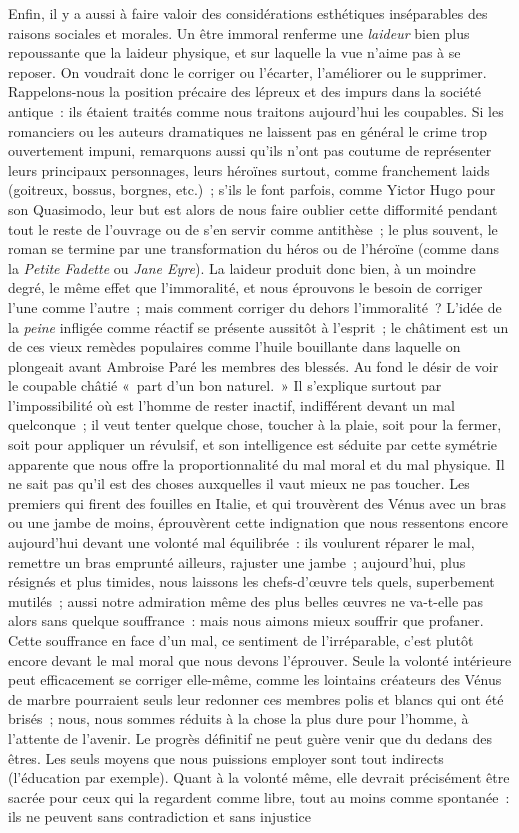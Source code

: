 \documentclass[french,twoside]{book} %
\begin{document}
Enfin, il y a aussi à faire valoir des considérations esthétiques inséparables des raisons sociales et morales. Un être immoral renferme une \emph{laideur} bien plus repoussante que la laideur physique, et sur laquelle la vue n’aime pas à se reposer. On voudrait donc le corriger ou l’écarter, l’améliorer ou le supprimer. Rappelons-nous la position précaire des lépreux et des impurs dans la société antique : ils étaient traités comme nous traitons aujourd’hui les coupables. Si les romanciers ou les auteurs dramatiques ne laissent pas en général le crime trop ouvertement impuni, remarquons aussi qu’ils n’ont pas coutume de représenter leurs principaux personnages, leurs héroïnes surtout, comme franchement laids (goitreux, bossus, borgnes, etc.) ; s’ils le font parfois, comme Yictor Hugo pour son Quasimodo, leur but est alors de nous faire oublier cette difformité pendant tout le reste de l’ouvrage ou de s’en servir comme antithèse ; le plus souvent, le roman se termine par une transformation du héros ou de l’héroïne (comme dans la \emph{Petite Fadette} ou \emph{Jane Eyre}). La laideur produit donc bien, à un moindre degré, le même effet que l’immoralité, et nous éprouvons le besoin de corriger l’une comme l’autre ; mais comment corriger du dehors l’immoralité ? L’idée de la \emph{peine} infligée comme réactif se présente aussitôt à l’esprit ; le châtiment est un de ces vieux remèdes populaires comme l’huile bouillante dans laquelle on plongeait avant Ambroise Paré les membres des blessés. Au fond le désir de voir le coupable châtié « part d’un bon naturel. » Il s’explique surtout par l’impossibilité où est l’homme de rester inactif, indifférent devant un mal quelconque ; il veut tenter quelque chose, toucher à la plaie, soit pour la fermer, soit pour appliquer un révulsif, et son intelligence est séduite par cette symétrie apparente que nous offre la proportionnalité du mal moral et du mal physique. Il ne sait pas qu’il est des choses auxquelles il vaut mieux ne pas toucher. Les premiers qui firent des fouilles en Italie, et qui trouvèrent des Vénus avec un bras ou une jambe de moins, éprouvèrent cette indignation que nous ressentons encore aujourd’hui devant une volonté mal équilibrée : ils voulurent réparer le mal, remettre un bras emprunté ailleurs, rajuster une jambe ; aujourd’hui, plus résignés et plus timides, nous laissons les chefs-d’œuvre tels quels, superbement mutilés ; aussi notre admiration même des plus belles œuvres ne va-t-elle pas alors sans quelque souffrance : mais nous aimons mieux souffrir que profaner. Cette souffrance en face d’un mal, ce sentiment de l’irréparable, c’est plutôt encore devant le mal moral que nous devons l’éprouver. Seule la volonté intérieure peut efficacement se corriger elle-même, comme les lointains créateurs des Vénus de marbre pourraient seuls leur redonner ces membres polis et blancs qui ont été brisés ; nous, nous sommes réduits à la chose la plus dure pour l’homme, à l’attente de l’avenir. Le progrès définitif ne peut guère venir que du dedans des êtres. Les seuls moyens que nous puissions employer sont tout indirects (l’éducation par exemple). Quant à la volonté même, elle devrait précisément être sacrée pour ceux qui la regardent comme libre, tout au moins comme spontanée : ils ne peuvent sans contradiction et sans injustice 
\end{document}
